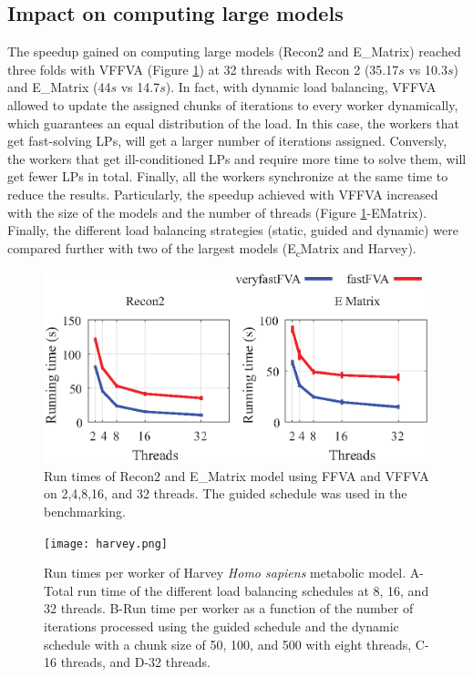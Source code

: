 \documentclass[8pt,a4paper]{book}
\begin{document}
\subsection*{Impact on computing large models}
The speedup gained on computing large models (Recon2 and E\_Matrix) reached three folds with VFFVA (Figure \ref{fig:largemodel.}) at 32 threads with Recon 2 (35.17$s$ vs 10.3$s$) and E\_Matrix (44$s$ vs 14.7$s$). In fact, with dynamic load balancing, VFFVA allowed to update the assigned chunks of iterations to every worker dynamically, which guarantees an equal distribution of the load. In this case, the workers that get fast-solving LPs, will get a larger number of iterations assigned. Conversly, the workers that get ill-conditioned LPs and require more time to solve them, will get fewer LPs in total. Finally, all the workers synchronize at the same time to reduce the results. Particularly, the speedup achieved with VFFVA increased with the size of the models and the number of threads (Figure \ref{fig:largemodel.}-E\textunderscore Matrix). 
Finally, the different load balancing strategies (static, guided and dynamic) were compared further with two of the largest models (E\textsubscript{c}\textunderscore Matrix and Harvey).
\begin{figure}[!htp]
\centering
\includegraphics[width=\textwidth,height=\textheight,keepaspectratio]{largemodels.eps}
\caption[Run times of Recon2 and E\textunderscore Matrix model.]{Run times of Recon2 and E\_Matrix model using FFVA and VFFVA on 2,4,8,16, and 32 threads. The guided schedule was used in the benchmarking.}
\label{fig:largemodel.}
\end{figure} 
\begin{figure}[!htp]
\centering
\texttt{[image: harvey.png]}
\caption[Run times per worker of Harvey \textit{Homo sapiens} model.]{Run times per worker of Harvey  \textit{Homo sapiens} metabolic model. A-Total run time of the different load balancing schedules at 8, 16, and 32 threads. B-Run time per worker as a function of the number of iterations processed using the guided schedule and the dynamic schedule with a chunk size of 50, 100, and 500 with eight threads, C-16 threads, and D-32 threads.}
\label{fig:harvey.}
\end{figure}
\end{document}

